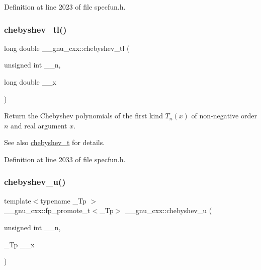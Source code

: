 Definition at line 2023 of file specfun.\+h.

\mbox{\label{group__gnu__math__spec__func_ga0c421700d244cdf58e3ac5ff267664d1}} 
\subsubsection{\texorpdfstring{chebyshev\+\_\+tl()}{chebyshev\_tl()}}
{\footnotesize\ttfamily long double \+\_\+\+\_\+gnu\+\_\+cxx\+::chebyshev\+\_\+tl (\begin{DoxyParamCaption}\item[{unsigned int}]{\+\_\+\+\_\+n,  }\item[{long double}]{\+\_\+\+\_\+x }\end{DoxyParamCaption})\hspace{0.3cm}{\ttfamily [inline]}}

Return the Chebyshev polynomials of the first kind $ T_n(x) $ of non-\/negative order $ n $ and real argument $ x $.

\begin{DoxySeeAlso}{See also}
\hyperlink{group__gnu__math__spec__func_ga4d9cae9de13a64ceeb4fb0226f4b7844}{chebyshev\+\_\+t} for details. 
\end{DoxySeeAlso}


Definition at line 2033 of file specfun.\+h.

\mbox{\label{group__gnu__math__spec__func_gafa90c06bdedb8459f20576297cf1608f}} 
\subsubsection{\texorpdfstring{chebyshev\+\_\+u()}{chebyshev\_u()}}
{\footnotesize\ttfamily template$<$typename \+\_\+\+Tp $>$ \\
\+\_\+\+\_\+gnu\+\_\+cxx\+::fp\+\_\+promote\+\_\+t$<$\+\_\+\+Tp$>$ \+\_\+\+\_\+gnu\+\_\+cxx\+::chebyshev\+\_\+u (\begin{DoxyParamCaption}\item[{unsigned int}]{\+\_\+\+\_\+n,  }\item[{\+\_\+\+Tp}]{\+\_\+\+\_\+x }\end{DoxyParamCaption})\hspace{0.3cm}{\ttfamily [inline]}}

